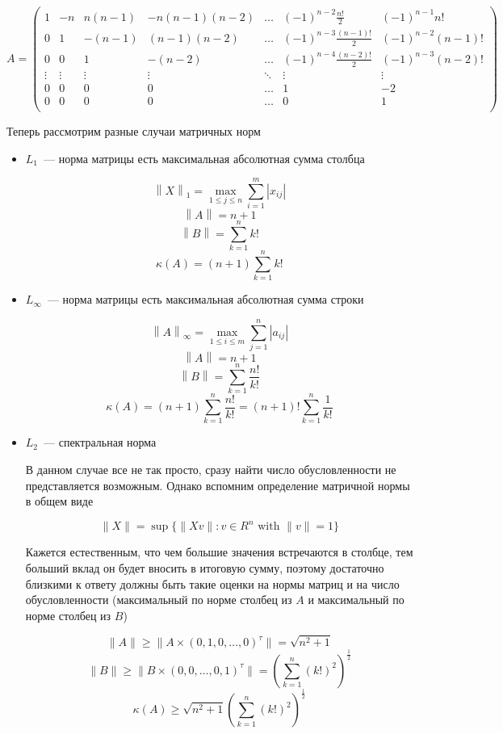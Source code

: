 \documentclass[11pt,a4paper,oneside]{article}
\begin{document}
$$A = \left(\begin{matrix}
	1 & -n & n (n - 1) & -n (n - 1) (n - 2) & \dots & (-1)^{n - 2} \frac{n!}{2} & (-1)^{n - 1} n! \\
	0 & 1 & -(n - 1) & (n - 1) (n - 2) & \dots & (-1)^{n - 3} \frac{(n - 1)!}{2} & (-1)^{n - 2} (n - 1)! \\
	0 & 0 & 1 & -(n - 2) & \dots & (-1)^{n - 4} \frac{(n - 2)!}{2} & (-1)^{n - 3} (n - 2)! \\
	\vdots & \vdots & \vdots & \vdots & \ddots & \vdots & \vdots \\
	0 & 0 & 0 & 0 & \dots & 1 & -2 \\
	0 & 0 & 0 & 0 & \dots & 0 & 1 \\
\end{matrix}\right)$$

Теперь рассмотрим разные случаи матричных норм

\begin{itemize}
	\item $L_1$~--- норма матрицы есть максимальная абсолютная сумма столбца
	
	$$ \left \| X \right \| _1 = \max \limits _{1 \leq j \leq n} \sum _{i=1} ^m | x_{ij} | $$
	$$ \left \| A \right \| = n + 1 $$
	$$ \left \| B \right \| = \sum_{k = 1}^{n} k! $$
	$$ \kappa(A) = (n + 1) \sum_{k = 1}^{n} k! $$
	
	\item $L_{\infty}$~--- норма матрицы есть максимальная абсолютная сумма строки
	
	$$ \left \| A \right \| _\infty = \max \limits _{1 \leq i \leq m} \sum _{j=1} ^n | a_{ij} | $$
	$$ \left \| A \right \| = n + 1 $$
	$$ \left \| B \right \| = \sum_{k = 1}^{n} \frac{n!}{k!} $$
	$$ \kappa(A) = (n + 1) \sum_{k = 1}^{n} \frac{n!}{k!} = (n + 1)! \sum_{k = 1}^{n} \frac{1}{k!} $$
	
	\item $L_2$~--- спектральная норма
	
	В данном случае все не так просто, сразу найти число обусловленности не представляется возможным. Однако вспомним определение матричной нормы в общем виде
	
	$$ \|X\| = \sup\{\|Xv\| : v\in R^n \mbox{ with }\|v\|= 1\} $$
	
	Кажется естественным, что чем большие значения встречаются в столбце, тем больший вклад он будет вносить в итоговую сумму, поэтому достаточно близкими к ответу должны быть такие оценки на нормы матриц и на число обусловленности (максимальный по норме столбец из $A$ и максимальный по норме столбец из $B$)
	
	$$ \|A\| \ge \|A \times (0, 1, 0, \dots, 0)^{\tau} \| = \sqrt{n^2 + 1} $$
	$$ \|B\| \ge \|B \times (0, 0, \dots, 0, 1)^{\tau} \|
		= \left( \sum_{k = 1}^{n} (k!)^2 \right)^{\frac{1}{2}} $$
	$$ \kappa(A) \ge \sqrt{n^2 + 1} \left( \sum_{k = 1}^{n} (k!)^2 \right)^{\frac{1}{2}} $$
		
\end{itemize}
\end{document}
